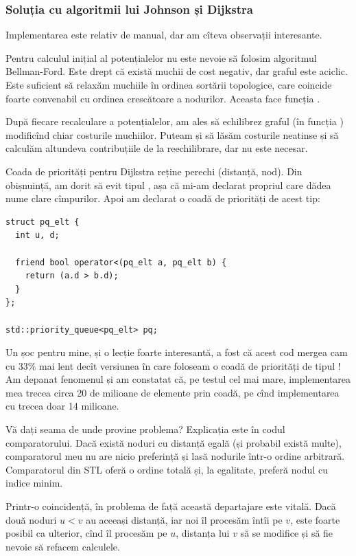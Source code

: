 \documentclass[../main.tex]{subfiles}
\begin{document}
\subsubsection*{Soluția cu algoritmii lui Johnson și Dijkstra}

Implementarea este relativ de manual, dar am cîteva observații interesante.

Pentru calculul inițial al potențialelor nu este nevoie să folosim algoritmul Bellman-Ford. Este drept că există muchii de cost negativ, dar graful este aciclic. Este suficient să relaxăm muchiile în ordinea sortării topologice, care coincide foarte convenabil cu ordinea crescătoare a nodurilor. Aceasta face funcția .

După fiecare recalculare a potențialelor, am ales să echilibrez graful (în funcția ) modificînd chiar costurile muchiilor. Puteam și să lăsăm costurile neatinse și să calculăm altundeva contribuțiile de la reechilibrare, dar nu este necesar.

Coada de priorități pentru Dijkstra reține perechi (distanță, nod). Din obișnuință, am dorit să evit tipul , așa că mi-am declarat propriul  care dădea nume clare cîmpurilor. Apoi am declarat o coadă de priorități de acest tip:

\begin{verbatim}
struct pq_elt {
  int u, d;

  friend bool operator<(pq_elt a, pq_elt b) {
    return (a.d > b.d);
  }
};

std::priority_queue<pq_elt> pq;
\end{verbatim}

Un șoc pentru mine, și o lecție foarte interesantă, a fost că acest cod mergea cam cu 33\% mai lent decît versiunea în care foloseam o coadă de priorități de tipul ! Am depanat fenomenul și am constatat că, pe testul cel mai mare, implementarea mea trecea circa 20 de milioane de elemente prin coadă, pe cînd implementarea cu  trecea doar 14 milioane.

Vă dați seama de unde provine problema? Explicația este în codul comparatorului. Dacă există noduri cu distanță egală (și probabil există multe), comparatorul meu nu are nicio preferință și lasă nodurile într-o ordine arbitrară. Comparatorul din STL oferă o ordine totală și, la egalitate, preferă nodul cu indice minim.

Printr-o coincidență, în problema de față această departajare este vitală. Dacă două noduri $u < v$ au aceeași distanță, iar noi îl procesăm întîi pe $v$, este foarte posibil ca ulterior, cînd îl procesăm pe $u$, distanța lui $v$ să se modifice și să fie nevoie să refacem calculele.
\end{document}
